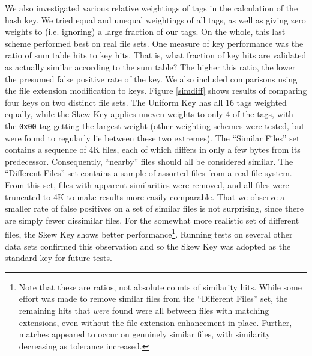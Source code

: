 \documentclass[10pt, twocolumn]{article}
\begin{document}
We also investigated various relative weightings of tags in the calculation of the hash key.  We tried equal and unequal weightings of all tags, as well as giving zero weights to (i.e. ignoring) a large fraction of our tags.  On the whole, this last scheme performed best on real file sets. One measure of key performance was the ratio of  sum table hits to key hits.  That is, what fraction of key hits are validated as actually similar according to the sum table?  The higher this ratio, the lower the presumed false positive rate of the key.  We also included comparisons using the file extension modification to keys.  Figure \ref{simdiff} shows results of comparing four keys on two distinct file sets.  The Uniform Key has all 16 tags weighted equally, while the Skew Key applies uneven weights to only 4 of the tags, with the {\tt 0x00} tag getting the largest weight (other weighting schemes were tested, but were found to regularly lie between these two extremes).  The ``Similar Files'' set contains a sequence of 4K files, each of which differs in only a few bytes from its predecessor.  Consequently, ``nearby'' files should all be considered similar.  The ``Different Files'' set contains a sample of assorted files from a real file system.  From this set, files with apparent similarities were removed, and all files were truncated to 4K to make results more easily comparable.  That we observe a smaller rate of false positives on a set of similar files is not surprising, since there are simply fewer dissimilar files.  For the somewhat more realistic set of different files, the Skew Key shows better performance\footnote{Note that these are ratios, not absolute counts of similarity hits.  While some effort was made to remove similar files from the ``Different Files'' set, the remaining hits that {\it were} found were all between files with matching extensions, even without the file extension enhancement in place.  Further, matches appeared to occur on genuinely similar files, with similarity decreasing as tolerance increased.}.  Running tests on several other data sets confirmed this observation and so the Skew Key was adopted as the standard key for future tests.
\end{document}
